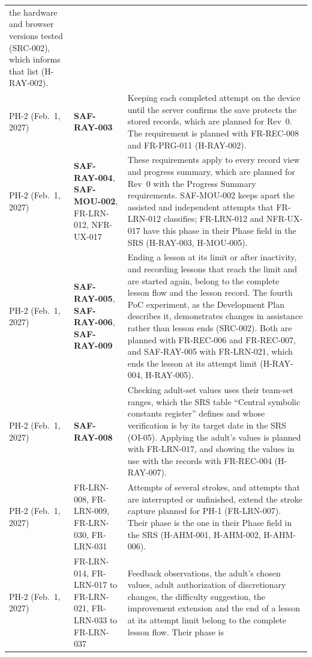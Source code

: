 \documentclass{article}
\begin{document}
{\begin{longtable}{@{}
  >{\raggedright\arraybackslash}p{1.7cm} >{\raggedright\arraybackslash}p{2.4cm}
  >{\raggedright\arraybackslash}p{\dimexpr\linewidth-4.1cm-4\tabcolsep\relax}
  @{}}
the hardware and browser versions tested (SRC-002), which informs that list
(H-RAY-002). \\
\addlinespace
PH-2 (Feb.~1, 2027) & \textbf{SAF-RAY-003} & Keeping each completed attempt on the device
until the server confirms the save protects the stored records, which are
planned for Rev~0. The requirement is planned with FR-REC-008 and FR-PRG-011
(H-RAY-002). \\
\addlinespace
PH-2 (Feb.~1, 2027) & \textbf{SAF-RAY-004}, \textbf{SAF-MOU-002}, FR-LRN-012, NFR-UX-017 & These
requirements apply to every record view and progress summary, which are planned
for Rev~0 with the Progress Summary requirements. SAF-MOU-002 keeps apart the
assisted and independent attempts that FR-LRN-012 classifies; FR-LRN-012 and
NFR-UX-017 have this phase in their Phase field in the SRS (H-RAY-003,
H-MOU-005). \\
\addlinespace
PH-2 (Feb.~1, 2027) & \textbf{SAF-RAY-005}, \textbf{SAF-RAY-006}, \textbf{SAF-RAY-009} & Ending a lesson
at its limit or after inactivity, and recording lessons that reach the limit
and are started again, belong to the
complete lesson flow and the lesson record. The fourth PoC experiment, as the
Development Plan describes it, demonstrates changes in assistance rather than
lesson ends (SRC-002). Both are planned with FR-REC-006 and FR-REC-007, and
SAF-RAY-005 with FR-LRN-021, which ends the lesson at its attempt limit
(H-RAY-004, H-RAY-005). \\
\addlinespace
PH-2 (Feb.~1, 2027) & \textbf{SAF-RAY-008} & Checking adult-set values uses their
team-set ranges, which the SRS table ``Central symbolic constants register''
defines and whose verification is by its target date in the SRS (OI-05). Applying the adult's
values is planned with FR-LRN-017, and showing the values in use with the
records with FR-REC-004 (H-RAY-007). \\
\addlinespace
PH-2 (Feb.~1, 2027) & FR-LRN-008, FR-LRN-009, FR-LRN-030, FR-LRN-031 &
Attempts of several strokes, and
attempts that are interrupted or unfinished, extend the stroke capture planned
for PH-1 (FR-LRN-007). Their phase is the one in their Phase field in the SRS
(H-AHM-001, H-AHM-002, H-AHM-006). \\
\addlinespace
PH-2 (Feb.~1, 2027) & FR-LRN-014, FR-LRN-017 to FR-LRN-021, FR-LRN-033 to
FR-LRN-037 & Feedback
observations, the adult's chosen values, adult authorization of discretionary
changes, the difficulty suggestion, the improvement extension and the end of a
lesson at its attempt limit belong to the complete lesson flow. Their phase is

\end{longtable}}
\end{document}
